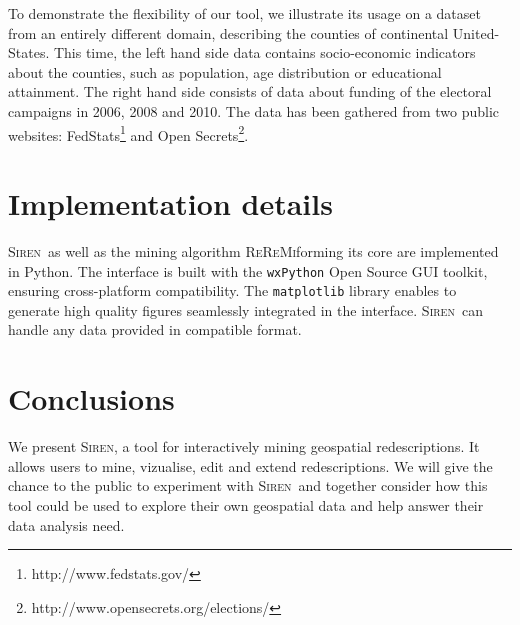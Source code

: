 \documentclass{sig-alternate}
\newcommand{\Siren}{\textsc{Siren}}
\newcommand{\ReReMi}{\textsc{ReReMi}}
\begin{document}
To demonstrate the flexibility of our tool, we illustrate its usage on a dataset from an entirely different domain, describing the counties of continental United-States. 
This time, the left hand side data contains socio-economic indicators about the counties, such as population, age distribution or educational attainment. The right hand side consists of data about funding of the electoral campaigns in 2006, 2008 and 2010. The data has been gathered from two public websites: FedStats\footnote{http://www.fedstats.gov/} and Open Secrets\footnote{http://www.opensecrets.org/elections/}.

\section{Implementation details}
\Siren\ as well as the mining algorithm \ReReMi forming its core are implemented in Python.
The interface is built with the \texttt{wxPython} Open Source GUI toolkit, ensuring cross-platform compatibility.
The \texttt{matplotlib} library enables to generate high quality figures seamlessly integrated in the interface.
\Siren\ can handle any data provided in compatible format. 

\section{Conclusions}
We present \Siren, a tool for interactively mining geospatial
redescriptions. It allows users to mine, vizualise, edit and extend
redescriptions.
We will give the chance to the public to experiment with \Siren\ and
together consider how this tool could be used to explore their own geospatial
data and help answer their data analysis need.


  

\balancecolumns
\end{document}
